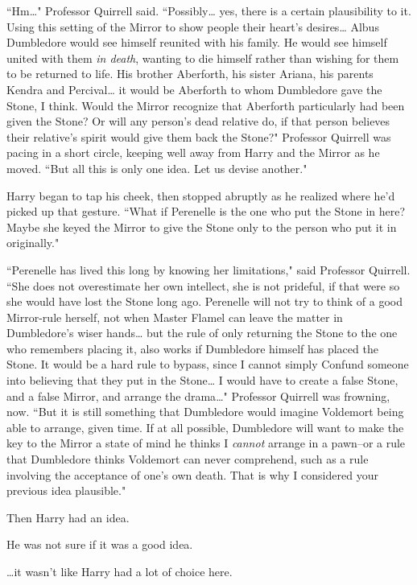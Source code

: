 ``Hm{\ldots}" Professor Quirrell said. ``Possibly{\ldots} yes, there is a certain plausibility to it. Using this setting of the Mirror to show people their heart's desires{\ldots} Albus Dumbledore would see himself reunited with his family. He would see himself united with them \emph{in death}, wanting to die himself rather than wishing for them to be returned to life. His brother Aberforth, his sister Ariana, his parents Kendra and Percival{\ldots} it would be Aberforth to whom Dumbledore gave the Stone, I think. Would the Mirror recognize that Aberforth particularly had been given the Stone? Or will any person's dead relative do, if that person believes their relative's spirit would give them back the Stone?" Professor Quirrell was pacing in a short circle, keeping well away from Harry and the Mirror as he moved. ``But all this is only one idea. Let us devise another."

Harry began to tap his cheek, then stopped abruptly as he realized where he'd picked up that gesture. ``What if Perenelle is the one who put the Stone in here? Maybe she keyed the Mirror to give the Stone only to the person who put it in originally."

``Perenelle has lived this long by knowing her limitations," said Professor Quirrell. ``She does not overestimate her own intellect, she is not prideful, if that were so she would have lost the Stone long ago. Perenelle will not try to think of a good Mirror-rule herself, not when Master Flamel can leave the matter in Dumbledore's wiser hands{\ldots} but the rule of only returning the Stone to the one who remembers placing it, also works if Dumbledore himself has placed the Stone. It would be a hard rule to bypass, since I cannot simply Confund someone into believing that they put in the Stone{\ldots} I would have to create a false Stone, and a false Mirror, and arrange the drama{\ldots}" Professor Quirrell was frowning, now. ``But it is still something that Dumbledore would imagine Voldemort being able to arrange, given time. If at all possible, Dumbledore will want to make the key to the Mirror a state of mind he thinks I \emph{cannot} arrange in a pawn\---or a rule that Dumbledore thinks Voldemort can never comprehend, such as a rule involving the acceptance of one's own death. That is why I considered your previous idea plausible."

Then Harry had an idea.

He was not sure if it was a good idea.

{\ldots}it wasn't like Harry had a lot of choice here.


